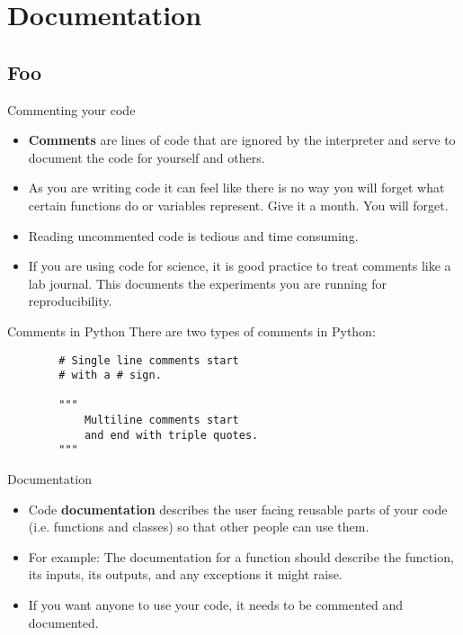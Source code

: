 \documentclass[serif,xcolor=pdftex,dvipsnames,table,hyperref={bookmarks=false,breaklinks}]{beamer}
\begin{document}
\maketitlepage

\section{Documentation}
\subsection{Foo}

\begin{frame}[t]{Commenting your code}
	\begin{itemize}[<+->]
		\item \textbf{Comments} are lines of code that are ignored by the interpreter and serve to document the code for yourself and others.
		\item As you are writing code it can feel like there is no way you will forget what certain functions do or variables represent. Give it a month. You will forget.
		\item Reading uncommented code is tedious and time consuming.
		\item If you are using code for science, it is good practice to treat comments like a lab journal. This documents the experiments you are running for reproducibility.
	\end{itemize}
\end{frame}

\begin{frame}[t,fragile]{Comments in Python}
	There are two types of comments in Python:

	\begin{lstlisting}
		# Single line comments start
		# with a # sign.
		
		"""
			Multiline comments start
			and end with triple quotes.
		"""
	\end{lstlisting}
\end{frame}

\begin{frame}[t]{Documentation}
	\begin{itemize}[<+->]
		\item Code \textbf{documentation} describes the user facing reusable parts of your code (i.e. functions and classes) so that other people can use them.
		\item For example: The documentation for a function should describe the function, its inputs, its outputs, and any exceptions it might raise.
		\item If you want anyone to use your code, it needs to be commented and documented.
	\end{itemize}
\end{frame}
\end{document}
